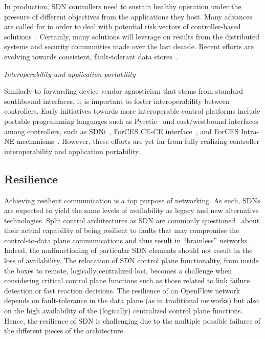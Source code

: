 In production, SDN controllers need to sustain healthy operation 
under the pressure of different objectives from the applications they
host. Many advances are called for in order
to deal with potential risk vectors of controller-based solutions~\cite{kreutz2013}. Certainly, 
many solutions will leverage on results from the distributed systems and security communities made over the last decade. 
Recent efforts are evolving towards consistent, fault-tolerant data stores~\cite{botelho2013}. 


%
\vspace{2mm}
\noindent \textit{Interoperability and application portability}

Similarly to forwarding device vendor agnosticism that stems from standard southbound interfaces, it is important to foster interoperability between controllers.
Early initiatives towards more interoperable control platforms include portable programming languages such as Pyretic~\cite{monsanto2013} and east/westbound interfaces among controllers, such as SDNi~\cite{yin2012}, ForCES CE-CE interface~\cite{doria2010,wang2011-1}, 
and ForCES Intra-NE mechanisms~\cite{ogawa2013}.
However, these efforts are yet far from fully realizing controller interoperability and application portability.

\subsection{Resilience}
\label{sec:resiliency}

Achieving resilient communication is a top purpose of networking.
As such, SDNs are expected to yield the same levels of availability as legacy and new alternative technologies. 
Split control architectures as SDN are commonly questioned~\cite{desai2010} about their
actual capability of being resilient to faults that may compromise
the control-to-data plane communications and thus result in
``brainless'' networks.
Indeed, the malfunctioning of particular SDN elements should not result in the loss
of availability. The relocation of SDN control plane functionality,
from inside the boxes to remote, logically centralized loci, becomes a
challenge when considering critical control plane functions such as
those related to link failure detection or fast reaction decisions.
The resilience of an OpenFlow network depends on fault-tolerance in the data plane (as in traditional networks) but also on the high availability of the (logically) centralized control plane functions. Hence, the resilience of SDN is challenging due to the multiple possible failures of the different pieces of the architecture. 

